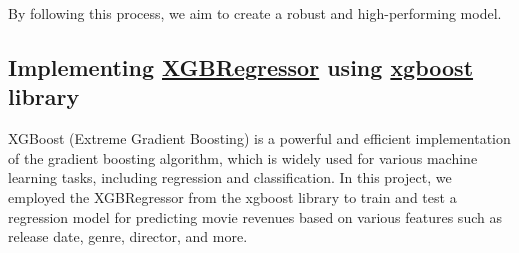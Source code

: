 \documentclass[conference]{IEEEtran}
\begin{document}
    By following this process, we aim to create a robust and high-performing model.

    \subsection{Implementing \href{https://xgboost.readthedocs.io/en/latest/python/python_api.html}{XGBRegressor} using \href{https://xgboost.readthedocs.io/en/stable/}{xgboost} library}
    XGBoost (Extreme Gradient Boosting) is a powerful and efficient implementation of the gradient boosting algorithm, which is widely used for various machine learning tasks, including regression and classification. In this project, we employed the XGBRegressor from the xgboost library to train and test a regression model for predicting movie revenues based on various features such as release date, genre, director, and more.
    
\end{document}
